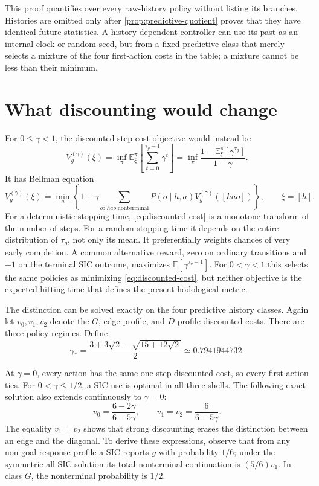 \documentclass[11pt]{article}
\theoremstyle{definition}
\theoremstyle{remark}
\newcommand{\E}{\mathbb E}
\begin{document}
This proof quantifies over every raw-history policy without listing its
branches.  Histories are omitted only after
\cref{prop:predictive-quotient} proves that they have identical future
statistics.  A history-dependent controller can use its past as an internal
clock or random seed, but from a fixed predictive class that merely selects a
mixture of the four first-action costs in the table; a mixture cannot be less
than their minimum.

\section{What discounting would change}
\label{sec:discounting}

For \(0\le\gamma<1\), the discounted step-cost objective would instead be
\begin{equation}
 V_g^{(\gamma)}(\xi)
 =\inf_\pi\E_\xi^\pi\left[\sum_{t=0}^{\tau_g-1}\gamma^t\right]
 =\inf_\pi\frac{1-\E_\xi^\pi[\gamma^{\tau_g}]}{1-\gamma}.
 \label{eq:discounted-cost}
\end{equation}
It has Bellman equation
\begin{equation}
 V_g^{(\gamma)}(\xi)=
 \min_a\left\{1+\gamma\sum_{o:\,hao\ \mathrm{nonterminal}}
 P(o\mid h,a)V_g^{(\gamma)}([hao])\right\},\qquad \xi=[h].
 \label{eq:discounted-bellman}
\end{equation}
For a deterministic stopping time, \eqref{eq:discounted-cost} is a monotone
transform of the number of steps. For a random stopping time it depends on
the entire distribution of \(\tau_g\), not only its mean. It preferentially
weights chances of very early completion. A common alternative reward,
zero on ordinary transitions and \(+1\) on the terminal SIC outcome, maximizes
\(\E[\gamma^{\tau_g-1}]\). For \(0<\gamma<1\) this selects the same policies
as minimizing \eqref{eq:discounted-cost}, but neither objective is the
expected hitting time that defines the present hodological metric.

The distinction can be solved exactly on the four predictive history classes.
Again let \(v_0,v_1,v_2\) denote the \(G\), edge-profile, and \(D\)-profile
discounted costs. There are three policy regimes. Define
\begin{equation}
 \gamma_*=\frac{3+3\sqrt2-\sqrt{15+12\sqrt2}}{2}
 \simeq0.7941944732.
 \label{eq:gamma-star}
\end{equation}

At \(\gamma=0\), every action has the same one-step discounted cost, so every
first action ties. For \(0<\gamma\le1/2\), a SIC use is optimal in all three
shells. The following exact solution also extends continuously to \(\gamma=0\):
\begin{equation}
 v_0=\frac{6-2\gamma}{6-5\gamma},
 \qquad
 v_1=v_2=\frac6{6-5\gamma}.
 \label{eq:discount-regime-one}
\end{equation}
The equality \(v_1=v_2\) shows that strong discounting erases the distinction
between an edge and the diagonal. To derive these expressions, observe that
from any non-goal response profile a SIC reports \(g\) with probability
\(1/6\); under
the symmetric all-SIC solution its total nonterminal continuation is
\((5/6)v_1\). In class \(G\), the nonterminal probability is \(1/2\).
\end{document}
